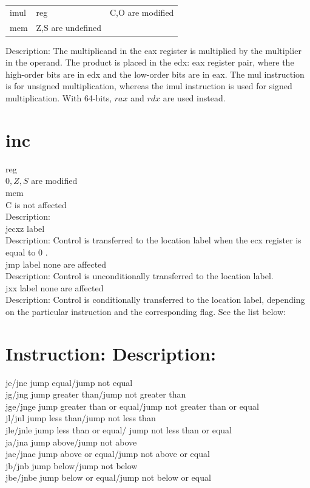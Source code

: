 \documentclass[10pt]{book}
\begin{document}
\begin{center}
\begin{tabular}{lll}
imul & reg & C,O are modified \\
mem & Z,S are undefined &  \\
\end{tabular}
\end{center}

Description: The multiplicand in the eax register is multiplied by the multiplier in the operand. The product is placed in the edx: eax register pair, where the high-order bits are in edx and the low-order bits are in eax. The mul instruction is for unsigned multiplication, whereas the imul instruction is used for signed multiplication. With 64-bits, $r a x$ and $r d x$ are used instead.

\section*{inc}
reg\\
$0, Z, S$ are modified\\
mem\\
C is not affected\\
Description:\\
jecxz label\\
Description: Control is transferred to the location label when the ecx register is equal to 0 .\\
jmp label none are affected\\
Description: Control is unconditionally transferred to the location label.\\
jxx label none are affected\\
Description: Control is conditionally transferred to the location label, depending on the particular instruction and the corresponding flag. See the list below:

\section*{Instruction: Description:}
je/jne jump equal/jump not equal\\
jg/jng jump greater than/jump not greater than\\
jge/jnge jump greater than or equal/jump not greater than or equal\\
jl/jnl jump less than/jump not less than\\
jle/jnle jump less than or equal/ jump not less than or equal\\
ja/jna jump above/jump not above\\
jae/jnae jump above or equal/jump not above or equal\\
jb/jnb jump below/jump not below\\
jbe/jnbe jump below or equal/jump not below or equal
\end{document}
